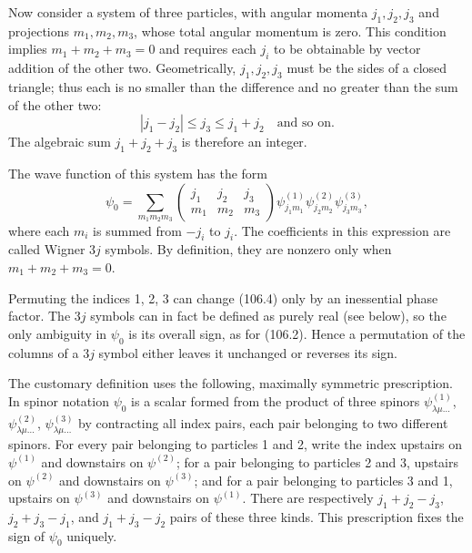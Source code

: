 Now consider a system of three particles, with angular momenta $j_1,j_2,j_3$ and projections $m_1,m_2,m_3$, whose total angular momentum is zero. This condition implies $m_1+m_2+m_3=0$ and requires each $j_i$ to be obtainable by vector addition of the other two. Geometrically, $j_1,j_2,j_3$ must be the sides of a closed triangle; thus each is no smaller than the difference and no greater than the sum of the other two:
\[
 |j_1-j_2|\leq j_3\leq j_1+j_2\quad\text{and so on}.
\]
The algebraic sum $j_1+j_2+j_3$ is therefore an integer.

The wave function of this system has the form
\begin{equation}
 \psi_0=\sum_{m_1m_2m_3}
 \begin{pmatrix}j_1&j_2&j_3\\m_1&m_2&m_3\end{pmatrix}
 \psi^{(1)}_{j_1m_1}\psi^{(2)}_{j_2m_2}\psi^{(3)}_{j_3m_3},
 \tag{106.4}
\end{equation}
where each $m_i$ is summed from $-j_i$ to $j_i$. The coefficients in this expression are called Wigner $3j$ symbols. By definition, they are nonzero only when $m_1+m_2+m_3=0$.

Permuting the indices 1, 2, 3 can change (106.4) only by an inessential phase factor. The $3j$ symbols can in fact be defined as purely real (see below), so the only ambiguity in $\psi_0$ is its overall sign, as for (106.2). Hence a permutation of the columns of a $3j$ symbol either leaves it unchanged or reverses its sign.

The customary definition uses the following, maximally symmetric prescription. In spinor notation $\psi_0$ is a scalar formed from the product of three spinors $\psi^{(1)}_{\lambda\mu\ldots}$, $\psi^{(2)}_{\lambda\mu\ldots}$, $\psi^{(3)}_{\lambda\mu\ldots}$ by contracting all index pairs, each pair belonging to two different spinors. For every pair belonging to particles 1 and 2, write the index upstairs on $\psi^{(1)}$ and downstairs on $\psi^{(2)}$; for a pair belonging to particles 2 and 3, upstairs on $\psi^{(2)}$ and downstairs on $\psi^{(3)}$; and for a pair belonging to particles 3 and 1, upstairs on $\psi^{(3)}$ and downstairs on $\psi^{(1)}$. There are respectively $j_1+j_2-j_3$, $j_2+j_3-j_1$, and $j_1+j_3-j_2$ pairs of these three kinds. This prescription fixes the sign of $\psi_0$ uniquely.

